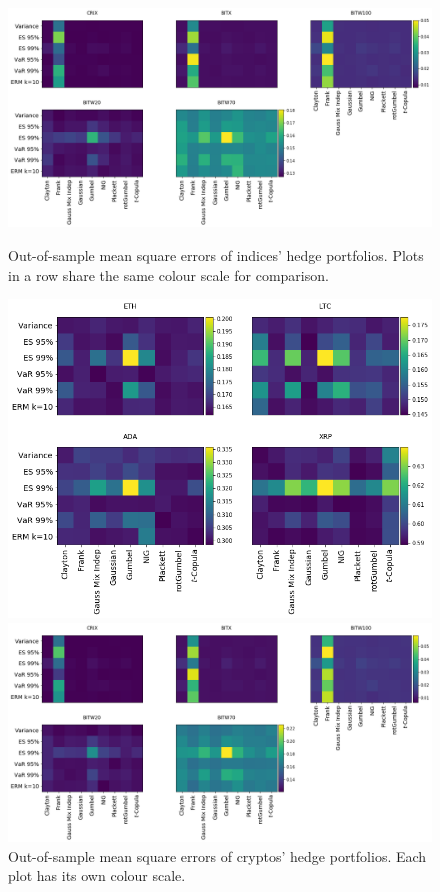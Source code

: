 \newpage
\begin{landscape}
\begin{figure}[h]
  \begin{minipage}[t]{0.475\linewidth}
    \centering
    \includegraphics[height=.5\linewidth]{_pics/MSE_indices.png}
    \caption{Out-of-sample mean square errors of indices' hedge portfolios. Plots in a row share the same colour scale for comparison.}
    \label{MSE_indices}
  \end{minipage}
  \hfill
  \begin{minipage}[t]{0.475\linewidth}
    \centering
    \includegraphics[height=.5\linewidth]{_pics/MSE_cryptos.png}
    \caption{Out-of-sample mean square errors of cryptos' hedge portfolios. Each plot has its own colour scale.}
    \label{MSE_cryptos}
  \end{minipage}
  \begin{minipage}[b]{0.475\linewidth}
    \centering
    \includegraphics[height=.5\linewidth]{_pics/semiVariance_indices.png}

\end{minipage}
\end{figure}
\end{landscape}
